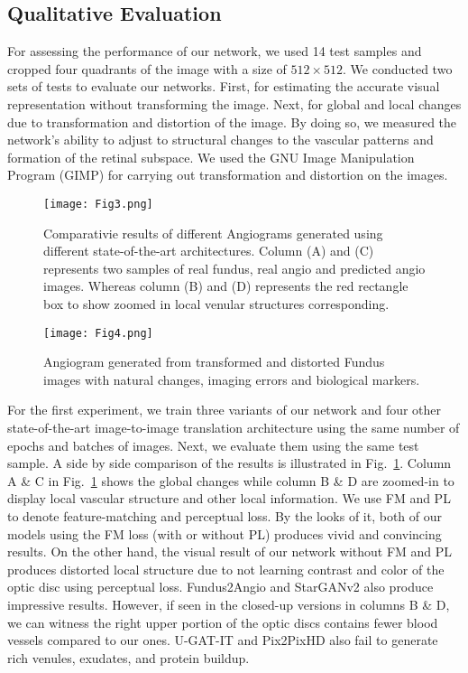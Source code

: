 \documentclass[a4paper,conference]{IEEEtran}
\begin{document}
\subsection{Qualitative Evaluation}
\label{subsec:qual}
For assessing the performance of our network, we used 14 test samples and cropped four quadrants of the image with a size of $512\times512$. We conducted two sets of tests to evaluate our networks. First, for estimating the accurate visual representation without transforming the image. Next, for global and local changes due to transformation and distortion of the image. By doing so, we measured the network's ability to adjust to structural changes to the vascular patterns and formation of the retinal subspace. We used the GNU Image Manipulation Program (GIMP) \cite{gimp2019gimp} for carrying out transformation and distortion on the images.
 
\begin{figure}[ht]
    \centering
    \texttt{[image: Fig3.png]}
    \caption{Comparativie results of different Angiograms generated using different state-of-the-art architectures. Column (A) and (C) represents two samples of real fundus, real angio and predicted angio images. Whereas column (B) and (D) represents the red rectangle box to show zoomed in local venular structures corresponding.}
    \label{fig3}
\end{figure}



\begin{figure}[ht]
    \centering
    \texttt{[image: Fig4.png]}
    \caption{Angiogram generated from transformed and distorted Fundus images with natural changes, imaging errors and biological markers.}
    \label{fig4}
\end{figure} 



For the first experiment, we train three variants of our network and four other state-of-the-art image-to-image translation architecture using the same number of epochs and batches of images. Next, we evaluate them using the same test sample. A side by side comparison of the results is illustrated in Fig.~\ref{fig3}. Column A \& C in Fig.~\ref{fig3} shows the global changes while column B \& D are zoomed-in to display local vascular structure and other local information. We use FM and PL to denote feature-matching and perceptual loss. By the looks of it, both of our models using the FM loss (with or without PL) produces vivid and convincing results. On the other hand, the visual result of our network without FM and PL produces distorted local structure due to not learning contrast and color of the optic disc using perceptual loss. Fundus2Angio and StarGANv2 also produce impressive results. However, if seen in the closed-up versions in columns B \& D, we can witness the right upper portion of the optic discs contains fewer blood vessels compared to our ones. U-GAT-IT and Pix2PixHD also fail to generate rich venules,  exudates, and protein buildup. 
\end{document}

